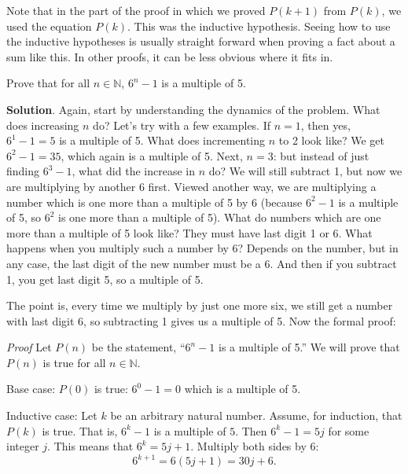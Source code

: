 \documentclass[11pt,]{book}
\makeatletter
\theoremstyle{ptxplainnotitle}
\theoremstyle{ptxplaintitle}
\renewcommand*{\proofname}{Proof}
\renewenvironment{proof}[1][\proofname]{\par
  \pushQED{\qed}%
  \normalfont \topsep6\p@\@plus6\p@\relax
  \trivlist
  \item\relax
    {\itshape
    #1\@addpunct{.}}\hspace\labelsep\ignorespaces
}{%
  \popQED\endtrivlist\@endpefalse
}
\theoremstyle{ptxdefinitionnotitle}
\theoremstyle{ptxdefinitiontitle}
\theoremstyle{ptxdefinitionnotitle}
\theoremstyle{ptxdefinitiontitle}
\theoremstyle{ptxdefinitionnotitle}
\theoremstyle{ptxdefinitiontitle}
\theoremstyle{ptxdefinitiontitlenonumber}
\theoremstyle{ptxdefinitiontitlenonumber}
\numberwithin{equation}{chapter}
\newcommand{\N}{\mathbb N}
\makeatother
\begin{document}
\hypertarget{p-555}{}%
Note that in the part of the proof in which we proved \(P(k+1)\) from \(P(k)\), we used the equation \(P(k)\). This was the inductive hypothesis. Seeing how to use the inductive hypotheses is usually straight forward when proving a fact about a sum like this. In other proofs, it can be less obvious where it fits in.%
\begin{example}\label{example-26}
\hypertarget{p-556}{}%
Prove that for all \(n \in \N\), \(6^n - 1\) is a multiple of 5.%
\par\smallskip%
\noindent\textbf{Solution}.\hypertarget{solution-76}{}\quad%
\hypertarget{p-557}{}%
Again, start by understanding the dynamics of the problem. What does increasing \(n\) do? Let's try with a few examples. If \(n = 1\), then yes, \(6^1 - 1 = 5\) is a multiple of 5. What does incrementing \(n\) to 2 look like? We get \(6^2 - 1 = 35\), which again is a multiple of 5. Next, \(n = 3\): but instead of just finding \(6^3 - 1\), what did the increase in \(n\) do? We will still subtract 1, but now we are multiplying by another 6 first. Viewed another way, we are multiplying a number which is one more than a multiple of 5 by 6 (because \(6^2 - 1\) is a multiple of 5, so \(6^2\) is one more than a multiple of 5). What do numbers which are one more than a multiple of 5 look like? They must have last digit 1 or 6. What happens when you multiply such a number by 6? Depends on the number, but in any case, the last digit of the new number must be a 6. And then if you subtract 1, you get last digit 5, so a multiple of 5.%
\par
\hypertarget{p-558}{}%
The point is, every time we multiply by just one more six, we still get a number with last digit 6, so subtracting 1 gives us a multiple of 5. Now the formal proof:%
\begin{proof}\hypertarget{proof-3}{}
\hypertarget{p-559}{}%
Let \(P(n)\) be the statement, ``\(6^n - 1\) is a multiple of 5.'' We will prove that \(P(n)\) is true for all \(n \in \N\).%
\par
\hypertarget{p-560}{}%
Base case: \(P(0)\) is true: \(6^0 -1 = 0\) which is a multiple of 5.%
\par
\hypertarget{p-561}{}%
Inductive case: Let \(k\) be an arbitrary natural number. Assume, for induction, that \(P(k)\) is true. That is, \(6^k - 1\) is a multiple of \(5\). Then \(6^k - 1 = 5j\) for some integer \(j\). This means that \(6^k = 5j + 1\). Multiply both sides by \(6\):%
\begin{equation*}
6^{k+1} = 6(5j+1) = 30j + 6.
\end{equation*}

\end{proof}
\end{example}
\end{document}
